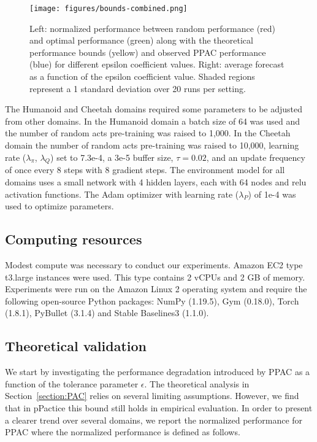 \documentclass{article}
\begin{document}
            \begin{figure*}
                \texttt{[image: figures/bounds-combined.png]}
                \caption{Left: normalized performance between random performance (red) and optimal performance (green) along with the theoretical performance bounds (yellow) and observed PPAC performance (blue) for different epsilon coefficient values. Right: average forecast as a function of the epsilon coefficient value. Shaded regions represent a 1 standard deviation over 20 runs per setting.}
                \label{bounds}
            \end{figure*}

            The Humanoid and Cheetah domains required some parameters to be adjusted from other domains. In the Humanoid domain a batch size of 64 was used and the number of random acts pre-training was raised to 1,000. In the Cheetah domain the number of random acts pre-training was raised to 10,000, learning rate ($\lambda_\pi$, $\lambda_Q$) set to 7.3e-4, a 3e-5 buffer size, $\tau=0.02$, and an update frequency of once every 8 steps with 8 gradient steps.
            The environment model for all domains uses a small network with 4 hidden layers, each with 64 nodes and relu activation functions. The Adam optimizer with learning rate ($\lambda_P$) of 1e-4 was used to optimize parameters.



        \subsection{Computing resources}

            Modest compute was necessary to conduct our experiments. Amazon EC2 type t3.large instances were used. This type contains 2 vCPUs and 2 GB of memory. Experiments were run on the Amazon Linux 2 operating system and require the following open-source Python packages: NumPy (1.19.5), Gym (0.18.0), Torch (1.8.1), PyBullet (3.1.4) and Stable Baselines3 (1.1.0).

        \subsection{Theoretical validation}

            We start by investigating the performance degradation introduced by PPAC as a function of the tolerance parameter $\epsilon$. The theoretical analysis in Section~\ref{section:PAC} relies on several limiting assumptions. However, we find that in pPactice this bound still holds in empirical evaluation. In order to present a clearer trend over several domains, we report the normalized performance for PPAC where the normalized performance is defined as follows.
\end{document}

